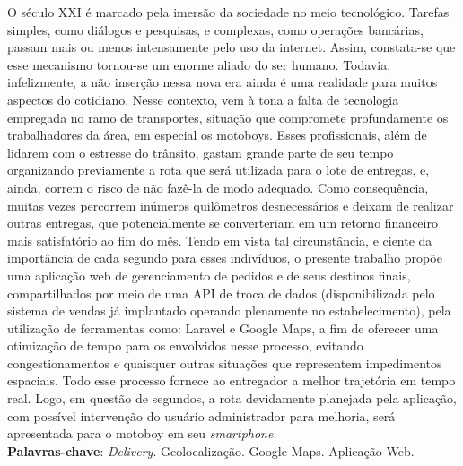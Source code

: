 
\begin{resumo}[RESUMO]
\begin{SingleSpacing}


O século XXI é marcado pela imersão da sociedade no meio tecnológico. Tarefas simples, como diálogos e pesquisas, e complexas, como operações bancárias, passam mais ou menos intensamente pelo uso da internet. Assim, constata-se que esse mecanismo tornou-se um enorme aliado do ser humano. Todavia, infelizmente, a não inserção nessa nova era ainda é uma realidade para muitos aspectos do cotidiano. Nesse contexto, vem à tona a falta de tecnologia empregada no ramo de transportes, situação que compromete profundamente os trabalhadores da área, em especial os motoboys. Esses profissionais, além de lidarem com o estresse do trânsito, gastam grande parte de seu tempo organizando previamente a rota que será utilizada para o lote de entregas, e, ainda, correm o risco de não fazê-la de modo adequado. Como consequência, muitas vezes percorrem inúmeros quilômetros desnecessários e deixam de realizar outras entregas, que potencialmente se converteriam em um retorno financeiro mais satisfatório ao fim do mês. Tendo em vista tal circunstância, e ciente da importância de cada segundo para esses indivíduos, o presente trabalho propõe uma aplicação web de gerenciamento de pedidos e de seus destinos finais, compartilhados por meio de uma API de troca de dados (disponibilizada pelo sistema de vendas já implantado operando plenamente no estabelecimento), pela utilização de ferramentas como: Laravel e Google Maps, a fim de oferecer uma otimização de tempo para os envolvidos nesse processo, evitando congestionamentos e quaisquer outras situações que representem impedimentos espaciais. Todo esse processo fornece ao entregador a melhor trajetória em tempo real. Logo, em questão de segundos, a rota devidamente planejada pela aplicação, com possível intervenção do usuário administrador para melhoria, será apresentada para o motoboy em seu \textit{smartphone}.\\

\textbf{Palavras-chave}: \textit{Delivery}. Geolocalização. Google Maps. Aplicação Web.

\end{SingleSpacing}
\end{resumo}